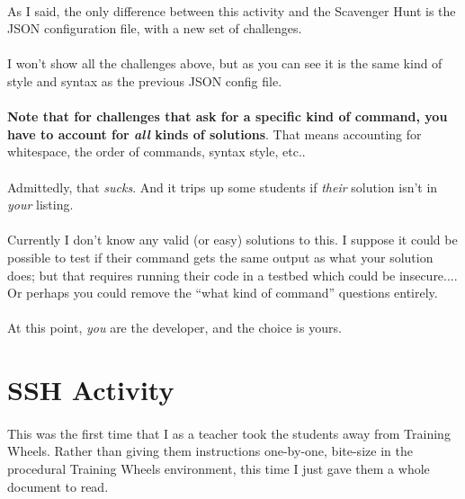 \documentclass[11pt]{article}
\begin{document}
	\paragraph{} As I said, the only difference between this activity and the Scavenger Hunt is the JSON configuration file, with a new set of challenges. 

	\paragraph{} I won't show all the challenges above, but as you can see it is the same kind of style and syntax as the previous JSON config file.

	\paragraph{} \textbf{Note that for challenges that ask for a specific kind of command, you have to account for \textit{all} kinds of solutions}. That means accounting for whitespace, the order of commands, syntax style, etc..

	\paragraph{} Admittedly, that \textit{sucks}. And it trips up some students if \textit{their} solution isn't in \textit{your} listing. 

	\paragraph{} Currently I don't know any valid (or easy) solutions to this. I suppose it could be possible to test if their command gets the same output as what your solution does; but that requires running their code in a testbed which could be insecure.... Or perhaps you could remove the ``what kind of command'' questions entirely.

	\paragraph{} At this point, \textit{you} are the developer, and the choice is yours.

	\newpage

	\section{SSH Activity}

	\paragraph{} This was the first time that I as a teacher took the students away from Training Wheels. Rather than giving them instructions one-by-one, bite-size in the procedural Training Wheels environment, this time I just gave them a whole document to read.
\end{document}
